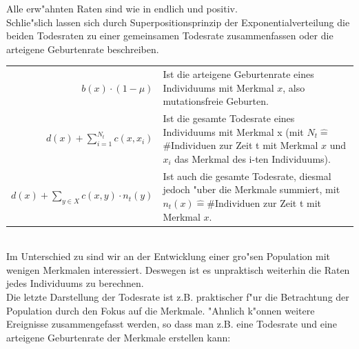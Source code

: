 \documentclass[11pt, a4paper, german]{article}
\theoremstyle{plain}
\begin{document}
	Alle erw"ahnten Raten sind wie in \cite{fournier2004microscopic} endlich und positiv. \\
	Schlie"slich lassen sich durch Superpositionsprinzip der Exponentialverteilung die beiden Todesraten zu einer gemeinsamen Todesrate zusammenfassen oder die arteigene Geburtenrate beschreiben.\\
	
	\begin{tabular}{ r p{18em} }
		$ b(x) \cdot (1 - \mu) $ & Ist die arteigene Geburtenrate eines Individuums mit Merkmal $ x $, also mutationsfreie Geburten.\\
		$ d(x) + \sum_{i=1}^{N_t} c(x, x_i) $ & Ist die gesamte Todesrate eines Individuums mit Merkmal x (mit $ N_t \hat{=} $ \#Individuen zur Zeit t mit Merkmal $ x $ und $ x_i $ das Merkmal des i-ten Individuums).\\
		$ d(x) + \sum_{y \in X} c(x,y) \cdot n_t(y) $ & Ist auch die gesamte Todesrate, diesmal jedoch "uber die Merkmale summiert, mit $ n_t(x) \hat{=} \text{\#Individuen}$ zur Zeit t mit Merkmal $ x $.
	\end{tabular}\\
	
	Im Unterschied zu \cite{Champagnat20061127} sind wir an der Entwicklung einer gro"sen Population mit wenigen Merkmalen interessiert. Deswegen ist es unpraktisch weiterhin die Raten jedes Individuums zu berechnen.\\
	Die letzte Darstellung der Todesrate ist z.B. praktischer f"ur die Betrachtung der Population durch den Fokus auf die Merkmale. "Ahnlich k"onnen weitere Ereignisse zusammengefasst werden, so dass man z.B. eine Todesrate und eine arteigene Geburtenrate der Merkmale erstellen kann:
	
\end{document}
